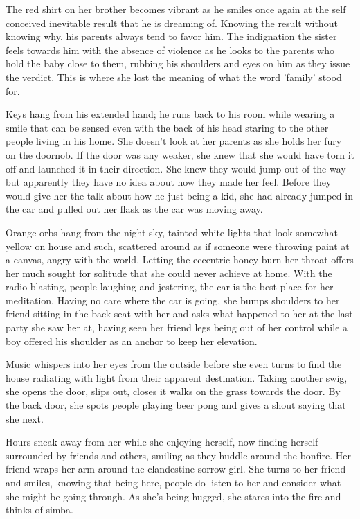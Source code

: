 \begin{Document}
        The red shirt on her brother becomes vibrant as he smiles once again at the self conceived inevitable result that he is dreaming of. Knowing the
    result without knowing why, his parents always tend to favor him. The indignation the sister feels towards him with the absence of violence as he
    looks to the parents who hold the baby close to them, rubbing his shoulders and eyes on him as they issue the verdict. This is where she lost the
    meaning of what the word 'family' stood for.

        Keys hang from his extended hand; he runs back to his room while wearing a smile that can be sensed even with the back of his head staring to the
    other people living in his home. She doesn't look at her parents as she holds her fury on the doornob. If the door was any weaker, she knew that she
    would have torn it off and launched it in their direction. She knew they would jump out of the way but apparently they have no idea about how they
    made her feel. Before they would give her the talk about how he just being a kid, she had already jumped in the car and pulled out her flask as the
    car was moving away.

       Orange orbs hang from the night sky, tainted white lights that look somewhat yellow on house and such, scattered around as if someone were throwing
    paint at a canvas, angry with the world. Letting the eccentric honey burn her throat offers her much sought for solitude that she could never achieve
    at home. With the radio blasting, people laughing and jestering, the car is the best place for her meditation. Having no care where the car is going,
    she bumps shoulders to her friend sitting in the back seat with her and asks what happened to her at the last party she saw her at, having seen her
    friend legs being out of her control while a boy offered his shoulder as an anchor to keep her elevation.

        Music whispers into her eyes from the outside before she even turns to find the house radiating with light from their apparent destination. Taking another
    swig, she opens the door, slips out, closes it walks on the grass towards the door. By the back door, she spots people playing beer pong and gives
    a shout saying that she next.

        Hours sneak away from her while she enjoying herself, now finding herself surrounded by friends and others, smiling as they huddle around the
    bonfire. Her friend wraps her arm around the clandestine sorrow girl. She turns to her friend and smiles, knowing that being here, people do
    listen to her and consider what she might be going through. As she's being hugged, she stares into the fire and thinks of simba.
\end{Document}
